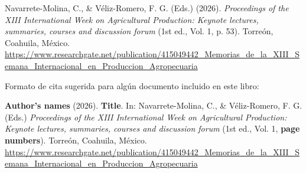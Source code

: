\documentclass{clase/sipa}
\begin{document}
Navarrete-Molina, C., \& Véliz-Romero, F. G. (Eds.) (2026). \textit{Proceedings of the XIII International Week on Agricultural Production: Keynote lectures, summaries, courses and discussion forum} (1st ed., Vol. 1, p. 53). Torreón, Coahuila, México. \url{https://www.researchgate.net/publication/415049442_Memorias_de_la_XIII_Semana_Internacional_en_Produccion_Agropecuaria}

Formato de cita sugerida para algún documento incluido en este libro:

\textbf{Author's names} (2026). \textbf{Title}. In: Navarrete-Molina, C., \& Véliz-Romero, F. G. (Eds.) \textit{Proceedings of the XIII International Week on Agricultural Production: Keynote lectures, summaries, courses and discussion forum} (1st ed., Vol. 1, \textbf{page numbers}). Torreón, Coahuila, México. \url{https://www.researchgate.net/publication/415049442_Memorias_de_la_XIII_Semana_Internacional_en_Produccion_Agropecuaria}
\end{document}

